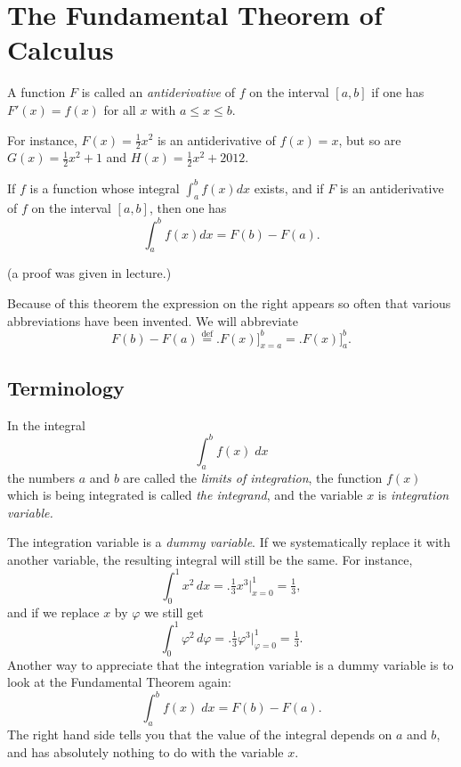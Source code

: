 \section{The Fundamental Theorem of Calculus} %
% 
%
\begin{definition}
  A function $F$ is called an \emph{antiderivative} of $f$ on the
  interval $[a, b]$ if one has $F'(x) = f(x)$ for all $x$ with
  $a\leq x \leq b$.
\end{definition}
\smallskip

For instance, $F(x) = \frac12 x^2$ is an antiderivative of $f(x) = x$,
but so are $G(x) = \frac12 x^2+1$ and $H(x) = \frac12x^2 + 2012$.

\begin{theorem}
  If $f$ is a function whose integral $\int_a^b f(x) dx$ exists, and if
  $F$ is an antiderivative of $f$ on the interval $[a,b]$, then one has
  \begin{equation}
    \label{eq:fundamental-theorem}
    \int_a^b f(x) dx = F(b) - F(a).
  \end{equation}
\end{theorem}
(a proof was given in lecture.)

Because of this theorem the expression on the right appears so often
that various abbreviations have been invented.  We will abbreviate
\[
F(b)-F(a) \stackrel{\text{def}}{=} \bigl. F(x)\bigr]_{x=a}^b =
\bigl.F(x)\bigr]_a^b .
\]

\subsection{Terminology}\label{sec:08terminology} %
In the integral
\[
\int_a^b f(x)\;dx
\]
the numbers $a$ and $b$ are called the \textit{limits of integration}, the
function $f(x)$ which is being integrated is called \textit{the integrand}, and
the variable $x$ is \textit{integration variable.}

The integration variable is a \textit{dummy variable}.  If we
systematically replace it with another variable, the resulting
integral will still be the same. For instance,
\[
\int_0^1 x^2\,dx = \bigl.\tfrac13 x^3\bigr|_{x=0}^1 = \tfrac13,
\]
and if we replace $x$ by $\varphi$ we still get
\[
\int_0^1 \varphi^2\, d\varphi
= \bigl.\tfrac13 \varphi^3\bigr|_{\varphi=0}^1 = \tfrac13.
\]
Another way to appreciate that the integration variable is a dummy
variable is to look at the Fundamental Theorem again:
\[
\int_a^b f(x)\;dx = F(b) -F(a).
\]
The right hand side tells you that the value of the integral depends
on $a$ and $b$, and has absolutely nothing to do with the variable $x$.

